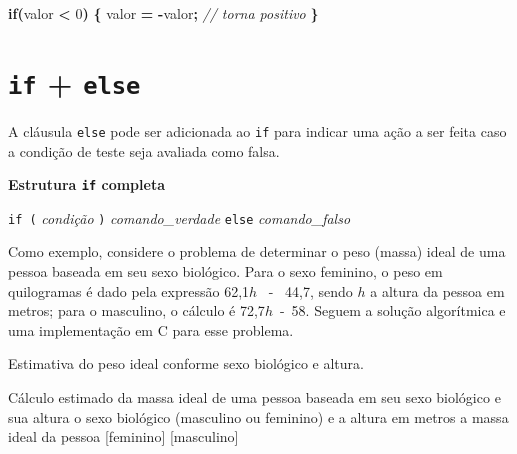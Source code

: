 \documentclass[
  11pt,
  a4paper,
]{scrbook}
\newenvironment{Shaded}{\begin{snugshade}}{\end{snugshade}}
\newcommand{\CommentTok}[1]{\textcolor[rgb]{0.56,0.35,0.01}{\textit{#1}}}
\newcommand{\ControlFlowTok}[1]{\textcolor[rgb]{0.13,0.29,0.53}{\textbf{#1}}}
\newcommand{\DecValTok}[1]{\textcolor[rgb]{0.00,0.00,0.81}{#1}}
\newcommand{\NormalTok}[1]{#1}
\newcommand{\OperatorTok}[1]{\textcolor[rgb]{0.81,0.36,0.00}{\textbf{#1}}}
\begin{document}
\begin{Shaded}
\begin{Highlighting}[]
\ControlFlowTok{if}\OperatorTok{(}\NormalTok{valor }\OperatorTok{\textless{}} \DecValTok{0}\OperatorTok{)} \OperatorTok{\{}
\NormalTok{    valor }\OperatorTok{=} \OperatorTok{{-}}\NormalTok{valor}\OperatorTok{;} \CommentTok{// torna positivo}
\OperatorTok{\}}
\end{Highlighting}
\end{Shaded}

\section{\texorpdfstring{\texttt{if} +
\texttt{else}}{if + else}}\label{if-else}

A cláusula \texttt{else} pode ser adicionada ao \texttt{if} para indicar
uma ação a ser feita caso a condição de teste seja avaliada como falsa.

\begin{tcolorbox}[enhanced jigsaw, colback=white, arc=.35mm, colframe=quarto-callout-color-frame, toprule=.15mm, leftrule=.75mm, left=2mm, rightrule=.15mm, bottomrule=.15mm, opacityback=0, breakable]

\vspace{-3mm}\textbf{Estrutura \texttt{if} completa}\vspace{3mm}

\texttt{if\ (} \emph{condição} \texttt{)} \emph{comando\_verdade}
\texttt{else} \emph{comando\_falso}

\end{tcolorbox}

Como exemplo, considere o problema de determinar o peso (massa) ideal de
uma pessoa baseada em seu sexo biológico. Para o sexo feminino, o peso
em quilogramas é dado pela expressão 62,1\(h\)~ -~ 44,7, sendo \(h\) a
altura da pessoa em metros; para o masculino, o cálculo é
72,7\(h\)~-~58. Seguem a solução algorítmica e uma implementação em C
para esse problema.

\begin{algorithm}
\caption{\label{alg-estimativa-peso-ideal}Estimativa do peso ideal
conforme sexo biológico e altura.}
\begingroup%

\begin{algorithmic}
    \Description Cálculo estimado da massa ideal de uma pessoa baseada em seu sexo biológico e sua altura
    \Require o sexo biológico (masculino ou feminino) e a altura em metros
    \Ensure a massa ideal da pessoa
    \Statex{}
        [feminino]
    \Else
        [masculino]
    \EndIf
\end{algorithmic}

\endgroup
\end{algorithm}
\end{document}
